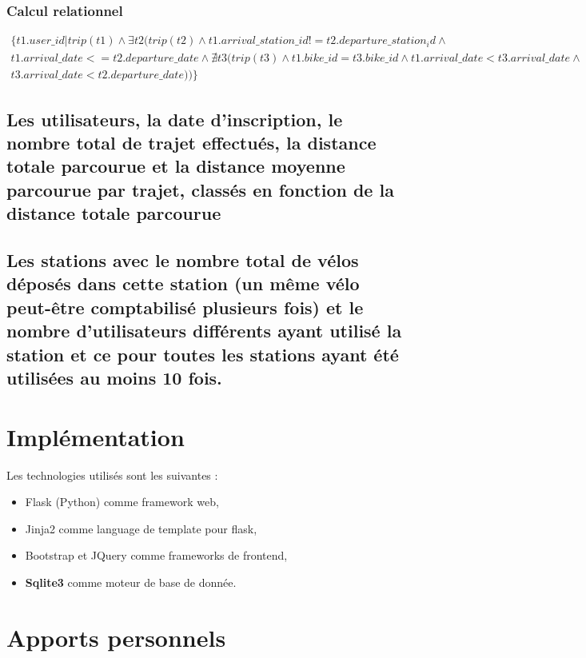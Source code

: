 \documentclass[a4paper,10pt]{article}
\begin{document}
\subsubsection{Calcul relationnel}
\begin{align}
	\{ t1.user\_id | trip(t1) \wedge \exists t2 (trip(t2) \wedge t1.arrival\_station\_id != t2.departure\_station_id \wedge \\ t1.arrival\_date <= t2.departure\_date  \wedge \nexists t3 (trip(t3) \wedge t1.bike\_id = t3.bike\_id \wedge t1.arrival\_date < t3.arrival\_date \wedge \\ t3.arrival\_date < t2.departure\_date)) \}
\end{align}


\pagebreak
\subsection{Les utilisateurs, la date d'inscription, le nombre total de trajet effectués, la distance totale parcourue et la distance moyenne parcourue par trajet, classés en fonction de la distance totale parcourue}


\pagebreak
\subsection{Les stations avec le nombre total de vélos déposés dans cette station (un même vélo peut-être comptabilisé plusieurs fois) et le nombre d'utilisateurs différents ayant utilisé la station et ce pour toutes les stations ayant été utilisées au moins 10 fois.}


\pagebreak
\section{Implémentation}
Les technologies utilisés sont les suivantes :
\begin{itemize}
	\item Flask (Python) comme framework web,
	\item Jinja2 comme language de template pour flask,
	\item Bootstrap et JQuery comme frameworks de frontend,
	\item \textbf{Sqlite3} comme moteur de base de donnée.
\end{itemize}

\section{Apports personnels}
\end{document}
